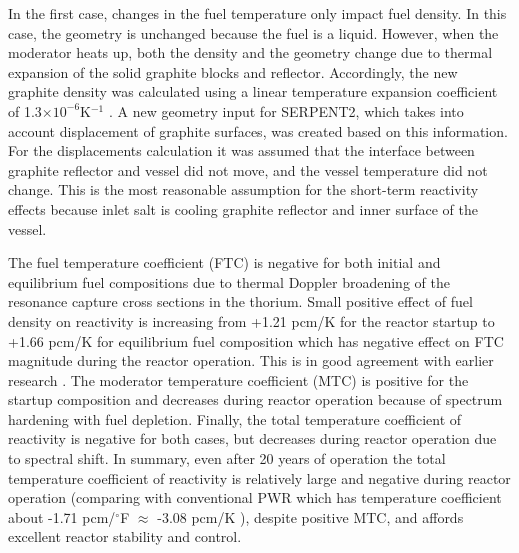 In the first case, changes in the fuel temperature only impact fuel density. In 
this case, the geometry is unchanged because the fuel is a liquid. However, 
when the moderator heats up, both the density and the geometry change due to 
thermal expansion of the solid graphite blocks and reflector. Accordingly, the 
new graphite density was calculated using a linear temperature expansion 
coefficient of 1.3$\times10^{-6}$K$^{-1}$ \cite{robertson_conceptual_1971}. A new 
geometry input for SERPENT2, which takes into account displacement of graphite 
surfaces, was created based on this information. For the displacements calculation 
it was assumed that the interface between graphite reflector and vessel did not move,
 and the vessel temperature did not change. This is the most reasonable assumption for
 the short-term reactivity effects because inlet salt is cooling graphite reflector and 
inner surface of the vessel.

The fuel temperature coefficient (FTC) is negative for both initial and 
equilibrium fuel compositions due to thermal Doppler broadening of the resonance 
capture cross sections in the thorium. Small positive effect of fuel density on 
reactivity is increasing from +1.21 pcm/K for the reactor startup to +1.66 pcm/K for 
equilibrium fuel composition which has negative effect on FTC magnitude during the 
reactor operation. This is in good agreement with earlier 
research \cite{robertson_conceptual_1971,park_whole_2015}. The moderator 
temperature coefficient (MTC) is positive for the startup composition and decreases 
during reactor operation because of spectrum hardening with fuel depletion. 
Finally, the total temperature coefficient of reactivity is negative for both 
cases, but decreases during reactor operation due to spectral shift. In 
summary, even after 20 years of operation the total temperature coefficient of 
reactivity is relatively large and negative during reactor operation (comparing 
with conventional PWR which has temperature coefficient about -1.71 pcm/$^\circ$F 
$\approx$ -3.08 pcm/K \cite{forget_integral_2018}), despite positive MTC, and 
affords excellent reactor stability and control.

